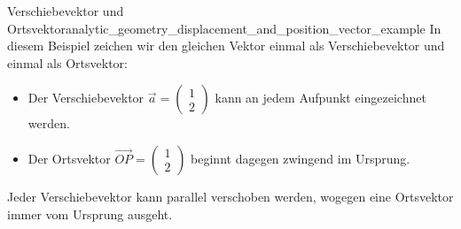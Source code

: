 \begin{ExampleBox}{Verschiebevektor und Ortsvektor}{analytic_geometry_displacement_and_position_vector_example}
  In diesem Beispiel zeichen wir den gleichen Vektor einmal als Verschiebevektor und einmal als Ortsvektor:
  \begin{itemize}[leftmargin=1.4em,itemsep=0.45em,topsep=0.35em]
    \item Der Verschiebevektor
      $\vec a=\begin{pmatrix}1\\2\end{pmatrix}$ kann an jedem Aufpunkt
      eingezeichnet werden.
    \item Der Ortsvektor
      $\overrightarrow{OP}=\begin{pmatrix}1\\2\end{pmatrix}$ beginnt
      dagegen zwingend im Ursprung.
  \end{itemize}

  \begin{center}
    \vspace{-0.45em}
    \centering
    \vspace{-0.55em}
  \end{center}
  Jeder Verschiebevektor kann parallel verschoben werden, wogegen eine Ortsvektor immer vom Ursprung ausgeht.
\end{ExampleBox}
